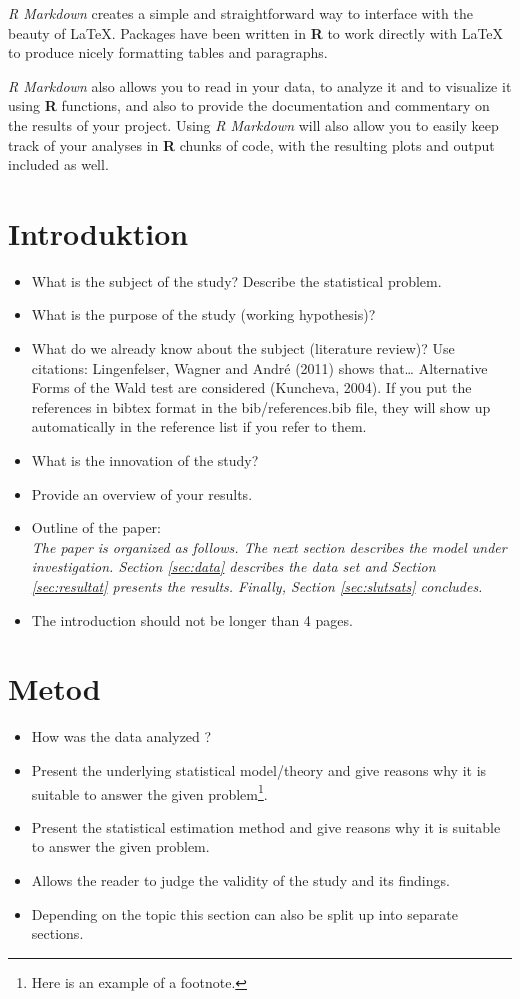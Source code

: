 \documentclass[a4paper,11pt]{article}
\begin{document}
\emph{R Markdown} creates a simple and straightforward way to interface with the
beauty of LaTeX. Packages have been written in \textbf{R} to work directly with LaTeX
to produce nicely formatting tables and paragraphs.

\emph{R Markdown} also allows you to read in your data, to analyze it and to
visualize it using \textbf{R} functions, and also to provide the documentation and
commentary on the results of your project. Using \emph{R Markdown} will also allow
you to easily keep track of your analyses in \textbf{R} chunks of code, with the
resulting plots and output included as well.

\hypertarget{introduktion}{%
\section{Introduktion}\label{introduktion}}
\begin{itemize}
\item
  What is the subject of the study? Describe the statistical problem.
\item
  What is the purpose of the study (working hypothesis)?
\item
  What do we already know about the subject (literature review)? Use citations:
  Lingenfelser, Wagner and André (2011) shows that\ldots{} Alternative Forms of the Wald test are
  considered (Kuncheva, 2004). If you put the references in bibtex format in the bib/references.bib file, they will show up automatically in the reference list if you refer to them.
\item
  What is the innovation of the study?
\item
  Provide an overview of your results.
\item
  Outline of the paper:\\
  \emph{The paper is organized as follows. The next section describes the model
  under investigation. Section \ref{sec:data} describes the data set
  and Section \ref{sec:resultat} presents the results. Finally, Section
  \ref{sec:slutsats} concludes.}
\item
  The introduction should not be longer than 4 pages.
\end{itemize}
\hypertarget{sec:metod}{%
\section{Metod}\label{sec:metod}}
\begin{itemize}
\item
  How was the data analyzed ?
\item
  Present the underlying statistical model/theory and give reasons why it is
  suitable to answer the given problem\footnote{Here is an example of a footnote.}.
\item
  Present the statistical estimation method and give reasons why it is
  suitable to answer the given problem.
\item
  Allows the reader to judge the validity of the study and its findings.
\item
  Depending on the topic this section can also be split up into separate
  sections.
\end{itemize}
\end{document}
